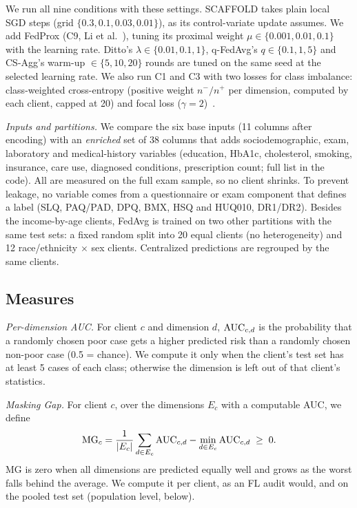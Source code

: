 We run all nine conditions with these settings. SCAFFOLD takes plain local SGD steps (grid $\{0.3, 0.1, 0.03, 0.01\}$), as its control-variate update assumes. We add FedProx (C9, Li et al.~\cite{li2020fedprox}), tuning its proximal weight $\mu \in \{0.001, 0.01, 0.1\}$ with the learning rate. Ditto's $\lambda \in \{0.01, 0.1, 1\}$, q-FedAvg's $q \in \{0.1, 1, 5\}$ and CS-Agg's warm-up $\in \{5, 10, 20\}$ rounds are tuned on the same seed at the selected learning rate. We also run C1 and C3 with two losses for class imbalance: class-weighted cross-entropy (positive weight $n^-/n^+$ per dimension, computed by each client, capped at 20) and focal loss ($\gamma{=}2$)~\cite{lin2017focal}.

\emph{Inputs and partitions.} We compare the six base inputs (11 columns after encoding) with an \emph{enriched} set of 38 columns that adds sociodemographic, exam, laboratory and medical-history variables (education, HbA1c, cholesterol, smoking, insurance, care use, diagnosed conditions, prescription count; full list in the code). All are measured on the full exam sample, so no client shrinks. To prevent leakage, no variable comes from a questionnaire or exam component that defines a label (SLQ, PAQ/PAD, DPQ, BMX, HSQ and HUQ010, DR1/DR2). Besides the income-by-age clients, FedAvg is trained on two other partitions with the same test sets: a fixed random split into 20 equal clients (no heterogeneity) and 12 race/ethnicity $\times$ sex clients. Centralized predictions are regrouped by the same clients.

\subsection{Measures}

\emph{Per-dimension AUC.} For client $c$ and dimension $d$, $\mathrm{AUC}_{c,d}$ is the probability that a randomly chosen poor case gets a higher predicted risk than a randomly chosen non-poor case (0.5 = chance). We compute it only when the client's test set has at least 5 cases of each class; otherwise the dimension is left out of that client's statistics.

\emph{Masking Gap.} For client $c$, over the dimensions $E_c$ with a computable AUC, we define
\begin{equation}
\mathrm{MG}_c = \frac{1}{|E_c|}\sum_{d\in E_c}\mathrm{AUC}_{c,d} - \min_{d\in E_c}\mathrm{AUC}_{c,d} \;\geq\; 0 .
\end{equation}
MG is zero when all dimensions are predicted equally well and grows as the worst falls behind the average. We compute it per client, as an FL audit would, and on the pooled test set (population level, below).

